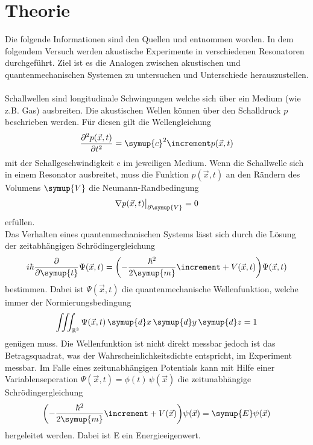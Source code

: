 \section{Theorie}
\label{sec:Theorie}
Die folgende Informationen sind den Quellen \cite{mech} und \cite{quant}  entnommen worden.
In dem folgendem Versuch werden akustische Experimente in verschiedenen Resonatoren durchgeführt.
Ziel ist es die Analogen zwischen akustischen und quantenmechanischen Systemen zu untersuchen und Unterschiede herauszustellen. 
\\
\\
Schallwellen sind longitudinale Schwingungen welche sich über ein Medium (wie z.B. Gas) ausbreiten. 
Die akustischen Wellen können über den Schalldruck $p$ beschrieben werden. Für diesen gilt die Wellengleichung
\begin{equation}
    \frac{\partial^2 p(\vec{x}, t)}{\partial t^2} = \symup{c}^2 \increment p(\vec{x}, t)
    \label{eqn:schallwellen}
\end{equation}
mit der Schallgeschwindigkeit c im jeweiligen Medium. Wenn die Schallwelle sich in einem Resonator ausbreitet, muss die Funktion $p(\vec{x}, t)$
an den Rändern des Volumens $\symup{V}$ die Neumann-Randbedingung
\begin{equation}
    \nabla p(\vec{x}, t) \bigr |_{\partial\symup{V}} = 0
    \label{eqn:neumann}
\end{equation}
erfüllen.
\\
Das Verhalten eines quantenmechanischen Systems lässt sich durch die Lösung der zeitabhängigen Schrödingergleichung 
\begin{equation}
    i \hbar \frac{\partial}{\partial \symup{t}} \Psi(\vec{x}, t) = \biggl(-\frac{\hbar^2}{2 \symup{m}} \increment + V(\vec{x}, t)\biggr) \Psi(\vec{x}, t)
    \label{eqn:schrödingert}
\end{equation}
bestimmen. Dabei ist $\Psi(\vec{x}, t)$ die quantenmechanische Wellenfunktion, welche immer der Normierungsbedingung
\begin{equation}
    \iiint_{\mathbb{R}^3} \Psi(\vec{x}, t)\, \symup{d}x\, \symup{d}y\, \symup{d}z = 1
    \label{eqn:norm}
\end{equation}
genügen muss. Die Wellenfunktion ist nicht direkt messbar jedoch ist das Betragsquadrat, was der Wahrscheinlichkeitsdichte entspricht, im Experiment messbar.
Im Falle eines zeitunabhängigen Potentials kann mit Hilfe einer Variablenseperation $\Psi(\vec{x}, t) = \phi(t)\, \psi(\vec{x})$ die zeitunabhängige Schrödingergleichung
\begin{equation}
    \biggl(-\frac{\hbar^2}{2 \symup{m}} \increment + V(\vec{x})\biggr)\psi(\vec{x}) = \symup{E} \psi(\vec{x})
    \label{eqn:schrödinger}
\end{equation}
hergeleitet werden. Dabei ist E ein Energieeigenwert.

